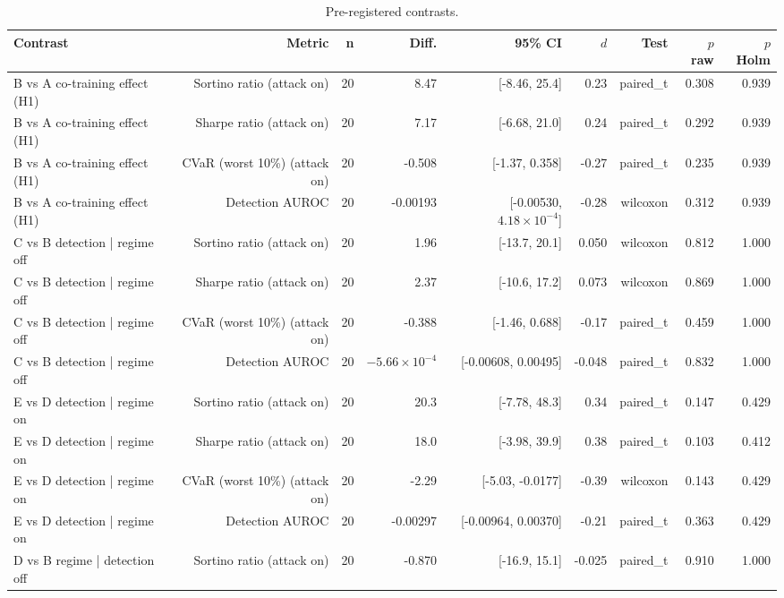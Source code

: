 \begin{table}[htbp]
  \centering
  \caption{Pre-registered contrasts.}
  \label{tab:contrasts}
  \begin{tabular}{lrrrrrrrr}
    \toprule
    Contrast & Metric & n & Diff. & 95\% CI & $d$ & Test & $p$ raw & $p$ Holm \\
    \midrule
    B vs A   co-training effect (H1) & Sortino ratio (attack on) & 20 & 8.47 & [-8.46, 25.4] & 0.23 & paired\_t & 0.308 & 0.939 \\
    B vs A   co-training effect (H1) & Sharpe ratio (attack on) & 20 & 7.17 & [-6.68, 21.0] & 0.24 & paired\_t & 0.292 & 0.939 \\
    B vs A   co-training effect (H1) & CVaR (worst 10\%) (attack on) & 20 & -0.508 & [-1.37, 0.358] & -0.27 & paired\_t & 0.235 & 0.939 \\
    B vs A   co-training effect (H1) & Detection AUROC & 20 & -0.00193 & [-0.00530, $4.18\times10^{-4}$] & -0.28 & wilcoxon & 0.312 & 0.939 \\
    C vs B   detection | regime off & Sortino ratio (attack on) & 20 & 1.96 & [-13.7, 20.1] & 0.050 & wilcoxon & 0.812 & 1.000 \\
    C vs B   detection | regime off & Sharpe ratio (attack on) & 20 & 2.37 & [-10.6, 17.2] & 0.073 & wilcoxon & 0.869 & 1.000 \\
    C vs B   detection | regime off & CVaR (worst 10\%) (attack on) & 20 & -0.388 & [-1.46, 0.688] & -0.17 & paired\_t & 0.459 & 1.000 \\
    C vs B   detection | regime off & Detection AUROC & 20 & $-5.66\times10^{-4}$ & [-0.00608, 0.00495] & -0.048 & paired\_t & 0.832 & 1.000 \\
    E vs D   detection | regime on & Sortino ratio (attack on) & 20 & 20.3 & [-7.78, 48.3] & 0.34 & paired\_t & 0.147 & 0.429 \\
    E vs D   detection | regime on & Sharpe ratio (attack on) & 20 & 18.0 & [-3.98, 39.9] & 0.38 & paired\_t & 0.103 & 0.412 \\
    E vs D   detection | regime on & CVaR (worst 10\%) (attack on) & 20 & -2.29 & [-5.03, -0.0177] & -0.39 & wilcoxon & 0.143 & 0.429 \\
    E vs D   detection | regime on & Detection AUROC & 20 & -0.00297 & [-0.00964, 0.00370] & -0.21 & paired\_t & 0.363 & 0.429 \\
    D vs B   regime | detection off & Sortino ratio (attack on) & 20 & -0.870 & [-16.9, 15.1] & -0.025 & paired\_t & 0.910 & 1.000 \\

\end{tabular}
\end{table}
